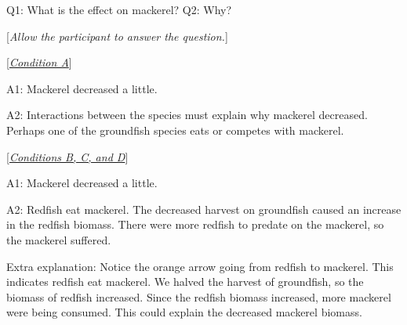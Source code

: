 {{{Q1: What is the effect on mackerel?  Q2: Why?

[\textit{Allow the participant to answer the question.}]

\begin{minipage}[t]{0.45\textwidth}
{\setlength{\parskip}{1em}
[\underline{\textit{Condition A}}]

A1: Mackerel decreased a little.

A2: Interactions between the species must explain why mackerel decreased.  Perhaps one of the groundfish species eats or competes with mackerel.
} \end{minipage} \qquad
\begin{minipage}[t]{0.45\textwidth}
{\setlength{\parskip}{1em}
[\underline{\textit{Conditions B, C, and D}}]

A1: Mackerel decreased a little.

A2: Redfish eat mackerel.  The decreased harvest on groundfish caused an increase in the redfish biomass. There were more redfish to predate on the mackerel, so the mackerel suffered.

Extra explanation: Notice the orange arrow going from redfish to mackerel.  This indicates redfish eat mackerel. We halved the harvest of groundfish, so the biomass of redfish increased.  Since the redfish biomass increased, more mackerel were being consumed.  This could explain the decreased mackerel biomass.
} \end{minipage}

}}}


